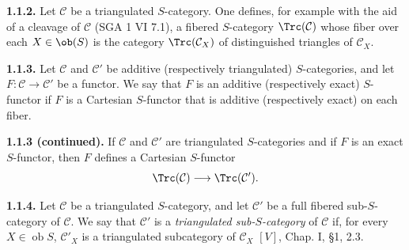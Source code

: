 \textbf{1.1.2.} Let \(\mathcal C\) be a triangulated \(S\)-category. One defines, for example with the aid of a cleavage of \(\mathcal C\) (SGA 1 VI 7.1), a fibered \(S\)-category \(\Trc(\mathcal C)\) whose fiber over each \(X\in \ob(S)\) is the category \(\Trc(\mathcal C_X)\) of distinguished triangles of \(\mathcal C_X\).

\textbf{1.1.3.} Let \(\mathcal C\) and \(\mathcal C'\) be additive (respectively triangulated) \(S\)-categories, and let \(F:\mathcal C\to\mathcal C'\) be a functor. We say that \(F\) is an additive (respectively exact) \(S\)-functor if \(F\) is a Cartesian \(S\)-functor that is additive (respectively exact) on each fiber.



\providecommand{\cC}{\mathcal C}
\providecommand{\cD}{\mathcal D}
\providecommand{\cK}{\mathcal K}
\providecommand{\cO}{\mathcal O}
\providecommand{\cS}{\mathcal S}
\providecommand{\Cpx}{\mathrm C}
\providecommand{\Kpx}{\mathrm K}
\providecommand{\Dpx}{\mathrm D}
\providecommand{\D}{\mathrm D}
\providecommand{\Ho}{\mathrm H}
\providecommand{\RHom}{\mathrm R\!\operatorname{Hom}}
\providecommand{\Ob}{\operatorname{ob}}
\providecommand{\Coker}{\operatorname{Coker}}
\providecommand{\Ker}{\operatorname{Ker}}
\providecommand{\Im}{\operatorname{Im}}
\providecommand{\Hom}{\operatorname{Hom}}
\providecommand{\Cone}{\operatorname{Cone}}
\providecommand{\id}{\operatorname{Id}}
\providecommand{\qis}{\xrightarrow{\sim}}


\textbf{1.1.3 (continued).} If \(\mathcal C\) and \(\mathcal C'\) are triangulated \(S\)-categories and if \(F\) is an exact \(S\)-functor, then \(F\) defines a Cartesian \(S\)-functor
\[
  \Trc(\mathcal C)\longrightarrow \Trc(\mathcal C').
\]

\textbf{1.1.4.} Let \(\mathcal C\) be a triangulated \(S\)-category, and let \(\mathcal C'\) be a full fibered sub-\(S\)-category of \(\mathcal C\). We say that \(\mathcal C'\) is a \emph{triangulated sub-\(S\)-category} of \(\mathcal C\) if, for every \(X\in\Ob S\), \(\mathcal C'_X\) is a triangulated subcategory of \(\mathcal C_X\) \([V]\), Chap. I, §1, 2.3.

